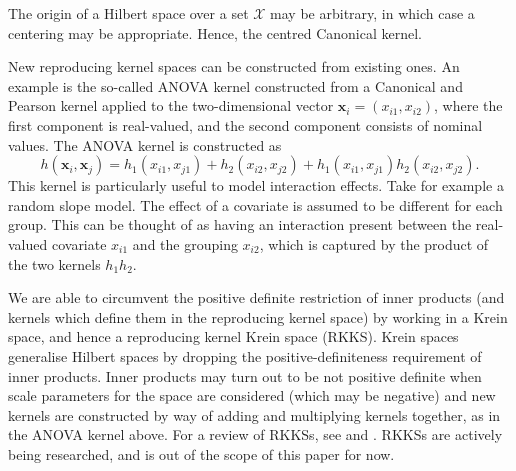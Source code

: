 \vspace{-1.5mm} 
\begin{remark}
	The origin of a Hilbert space over a set $\mathcal X$ may be arbitrary, in which case a centering may be appropriate. Hence, the centred Canonical kernel. 
\end{remark}

\vspace{-1.5mm} 
New reproducing kernel spaces can be constructed from existing ones. An example is the so-called ANOVA kernel constructed from a Canonical and Pearson kernel applied to the two-dimensional vector $\mathbf x_i= (x_{i1}, x_{i2})$, where the first component is real-valued, and the second component consists of nominal values. The ANOVA kernel is constructed as
\[
	h(\mathbf x_i, \mathbf x_j) = h_1(x_{i1}, x_{j1}) + h_2(x_{i2}, x_{j2}) + h_1(x_{i1}, x_{j1})h_2(x_{i2}, x_{j2}).
\] 
This kernel is particularly useful to model interaction effects. Take for example a random slope model. The effect of a covariate is assumed to be different for each group. This can be thought of as having an interaction present between the real-valued covariate $x_{i1}$ and the grouping $x_{i2}$, which is captured by the product of the two kernels $h_1h_2$.


\vspace{3mm}
\begin{remark}
	We are able to circumvent the positive definite restriction of inner products (and kernels which define them in the reproducing kernel space) by working in a Krein space, and hence a reproducing kernel Krein space (RKKS). Krein spaces generalise Hilbert spaces by dropping the positive-definiteness requirement of inner products. Inner products may turn out to be not positive definite when scale parameters for the space are considered (which may be negative) and new kernels are constructed by way of adding and multiplying kernels together, as in the ANOVA kernel above. For a review of RKKSs, see \cite{alpay1991} and \cite{Ong2004}. RKKSs are actively being researched, and is out of the scope of this paper for now. 
\end{remark}

